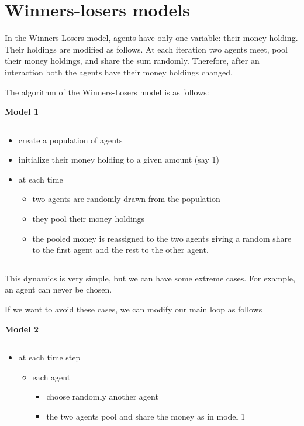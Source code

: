 \documentclass{article}
\providecommand{\tightlist}{%
  \setlength{\itemsep}{0pt}\setlength{\parskip}{0pt}}
\begin{document}
\section{Winners-losers models}
In the Winners-Losers model, agents have only one variable: their money holding. Their holdings are modified as follows. At each iteration two agents meet, pool their money holdings, and share the sum randomly.  
Therefore, after an interaction both the agents have their money holdings changed.


The algorithm of the Winners-Losers model is as follows:

\vskip2mm
\noindent\textbf{Model 1}
\vskip1mm
\hrule

\begin{itemize}
\tightlist
\item
  create a population of agents
\item
  initialize their money holding to a given amount (say 1)
\item
  at each time

  \begin{itemize}
  \tightlist
  \item
    two agents are randomly drawn from the population
  \item
    they pool their money holdings
  \item
    the pooled money is reassigned to the two agents giving a random
    share to the first agent and the rest to the other agent.
  \end{itemize}
\end{itemize}
\vskip-2mm
\hrule

\vskip4mm
This dynamics is very simple, but we can have some extreme cases. For
example, an agent can never be chosen.

If we want to avoid these cases, we can modify our main loop as follows

\vskip2mm
\noindent\textbf{Model 2}
\vskip1mm
\hrule

\begin{itemize}
\tightlist
\item
  at each time step

  \begin{itemize}
  \tightlist
  \item
    each agent

    \begin{itemize}
    \tightlist
    \item
      choose randomly another agent
    \item
      the two agents pool and share the money as in model 1
    \end{itemize}
  \end{itemize}
\end{itemize}
\end{document}
